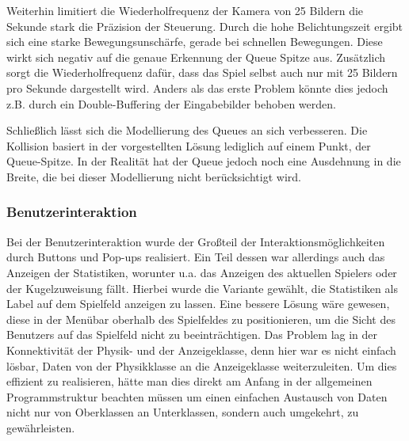 Weiterhin limitiert die Wiederholfrequenz der Kamera von 25 Bildern die Sekunde stark die Präzision der Steuerung. 
Durch die hohe Belichtungszeit ergibt sich eine starke Bewegungsunschärfe, gerade bei schnellen Bewegungen. 
Diese wirkt sich negativ auf die genaue Erkennung der Queue Spitze aus.
Zusätzlich sorgt die Wiederholfrequenz dafür, dass das Spiel selbst auch nur mit 25 Bildern pro Sekunde dargestellt wird. 
Anders als das erste Problem könnte dies jedoch z.B. durch ein Double-Buffering der Eingabebilder behoben werden.

Schließlich lässt sich die Modellierung des Queues an sich verbesseren.
Die Kollision basiert in der vorgestellten Lösung lediglich auf einem Punkt, der Queue-Spitze.
In der Realität hat der Queue jedoch noch eine Ausdehnung in die Breite, die bei dieser Modellierung nicht berücksichtigt wird.

\subsubsection{Benutzerinteraktion}
Bei der Benutzerinteraktion wurde der Großteil der Interaktionsmöglichkeiten durch Buttons und Pop-ups realisiert.
Ein Teil dessen war allerdings auch das Anzeigen der Statistiken, worunter u.a. das Anzeigen des aktuellen Spielers oder der Kugelzuweisung fällt. Hierbei wurde die Variante gewählt, die Statistiken als Label auf dem Spielfeld anzeigen zu lassen.
Eine bessere Lösung wäre gewesen, diese in der Menübar oberhalb des Spielfeldes zu positionieren, um die Sicht des Benutzers auf das Spielfeld nicht zu beeinträchtigen. 
Das Problem lag in der Konnektivität der Physik- und der Anzeigeklasse, denn hier war es nicht einfach lösbar, Daten von der Physikklasse an die Anzeigeklasse weiterzuleiten.
Um dies effizient zu realisieren, hätte man dies direkt am Anfang in der allgemeinen Programmstruktur beachten müssen um einen einfachen Austausch von Daten nicht nur von Oberklassen an Unterklassen, sondern auch umgekehrt, zu gewährleisten.